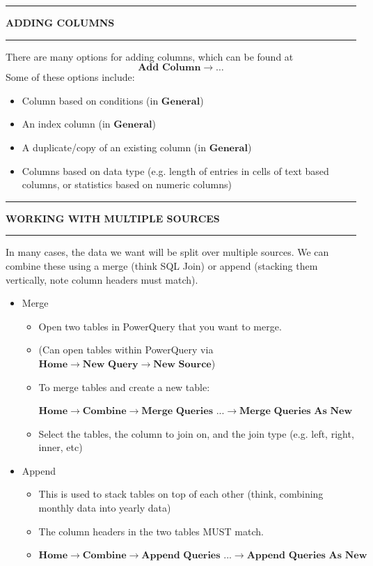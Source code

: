 \documentclass[8pt]{extarticle}
\newcommand{\heading}[1]{%
    \noindent
    \rule{\linewidth}{0.4pt}
    \begin{center}
        \vspace{-1ex}
        \textbf{#1}        
        \vspace{-2.5ex}
    \end{center}
    \rule{\linewidth}{0.4pt}
}
\begin{document}
\begin{multicols}{3}
\columnbreak
\heading{ADDING COLUMNS}

There are many options for adding columns, which can be found at 
\[\textbf{Add Column} \rightarrow \dots\]
Some of these options include:
\begin{itemize}
    \item Column based on conditions (in $\textbf{General}$)
    \item An index column (in $\textbf{General}$)
    \item A duplicate/copy of an existing column  (in $\textbf{General}$)
    \item Columns based on data type (e.g. length of entries in cells of text based columns, or statistics based on numeric columns)
\end{itemize}

\heading{WORKING WITH MULTIPLE SOURCES}

In many cases, the data we want will be split over multiple sources. We can combine these using a merge (think SQL Join) or append (stacking them vertically, note column headers must match).

\begin{itemize}
    \item Merge
    \begin{itemize}
        \item Open two tables in PowerQuery that you want to merge.
        \item (Can open tables within PowerQuery via $\textbf{Home} \rightarrow \textbf{New Query} \rightarrow \textbf{New Source}$)
        \item To merge tables and create a new table:
        
        $\textbf{Home} \rightarrow \textbf{Combine} \rightarrow \textbf{Merge Queries ...} \rightarrow \textbf{Merge Queries As New}$
        \item Select the tables, the column to join on, and the join type (e.g. left, right, inner, etc)
    \end{itemize}
    \item Append
    \begin{itemize}
        \item This is used to stack tables on top of each other (think, combining monthly data into yearly data)
        \item The column headers in the two tables MUST match. 
        \item $\textbf{Home} \rightarrow \textbf{Combine} \rightarrow \textbf{Append Queries ...} \rightarrow \textbf{Append Queries As New}$
    \end{itemize}
\end{itemize}


\end{multicols}
\end{document}
